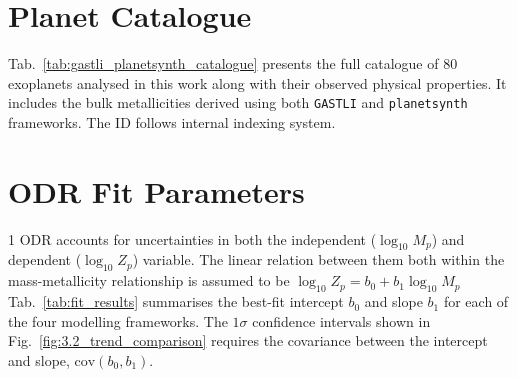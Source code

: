 \documentclass{aa}
\begin{document}
\begin{appendix}
\onecolumn
\section{Planet Catalogue}
Tab.~\ref{tab:gastli_planetsynth_catalogue} presents the full catalogue of 80 exoplanets analysed in this work along with their observed physical properties. It includes the bulk  metallicities derived using both \texttt{GASTLI} and \texttt{planetsynth} frameworks. The ID follows internal indexing system. 



\section{ODR Fit Parameters}
\begin{multicols}{1}
ODR accounts for uncertainties in both the independent ($\log_{10}M_p$) and dependent ($\log_{10}Z_p$) variable. The linear relation between them both within the mass-metallicity relationship is assumed to be $\log_{10} Z_p = b_0 + b_1 \log_{10} M_p$
Tab.~\ref{tab:fit_results} summarises the best-fit intercept $b_0$ and slope $b_1$ for each of the four modelling frameworks. The $1\sigma$ confidence intervals shown in Fig.~\ref{fig:3.2_trend_comparison} requires the covariance between the intercept and slope, $\text{cov}(b_0,b_1)$. 

\vspace{1em}

\vspace{1em}
\end{multicols}




\end{appendix}
\end{document}

